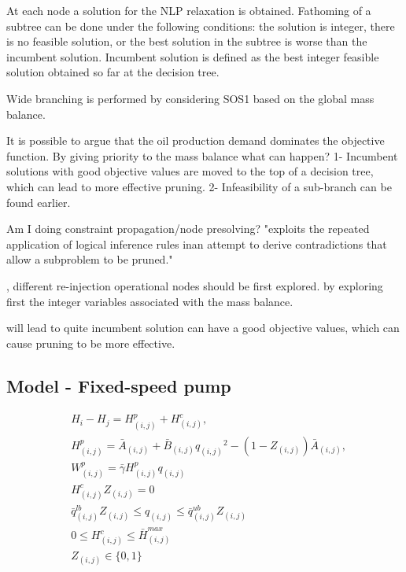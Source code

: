At each node a solution for the NLP relaxation is obtained. Fathoming of a subtree can be done under the following conditions: the solution is integer, there is no feasible solution, or the best solution in the subtree is worse than the incumbent solution. Incumbent solution is defined as the best integer feasible solution obtained so far at the decision tree. 

Wide branching is performed by considering SOS1 based on the global mass balance.

It is possible to argue that the oil production demand dominates the objective function. By giving priority to the mass balance what can happen?
1- Incumbent solutions with good objective values are moved to the top of a decision tree, which can lead to more effective pruning.
2- Infeasibility of a sub-branch can be found earlier.

Am I doing constraint propagation/node presolving? "exploits the repeated application of logical inference rules inan attempt to derive contradictions that allow a subproblem to be pruned."

, different re-injection operational nodes should be first explored. by exploring first the integer variables associated with the mass balance.

will lead to quite incumbent solution can have a good objective values, which can cause pruning to be more effective.



\subsection{Model - Fixed-speed pump}

\begin{subequations}
    \begin{alignat}{2}
        & H_i - H_j = H^p_{(i,j)} + H^c_{(i,j)}, 
        \\
        & H^p_{(i,j)} = \bar{A}_{(i,j)} + \bar{B}_{(i,j)}{q_{(i,j)}}^2 - (1 - Z_{(i,j)})\bar{A}_{(i,j)}, 
        \\
        & W^p_{(i,j)} = \bar{\gamma} H^p_{(i,j)} q_{(i,j)} 
        \\
        & H^c_{(i,j)}Z_{(i,j)} = 0
        \\
        & \bar {q}^{lb}_{(i,j)} Z_{(i,j)}  \leq  q_{(i,j)} \leq \bar{q}^{ub}_{(i,j)}Z_{(i,j)} 
        \\
        & 0 \leq H^c_{(i,j)} \leq \bar H^{max}_{(i,j)} 
        \\
        & Z_{(i,j)} \in \{0,1\}
    \end{alignat}
\end{subequations}

